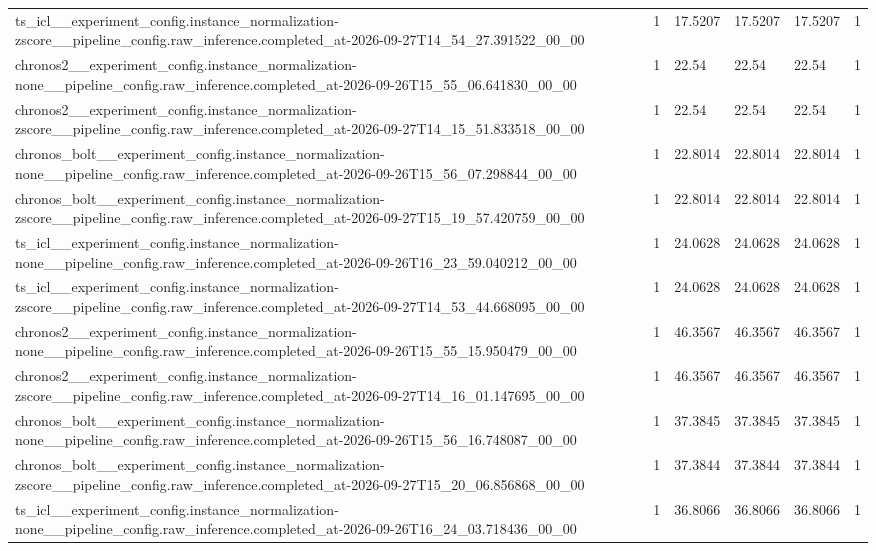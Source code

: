 \begin{tabular}{llllll}
ts\_icl\_\_experiment\_config.instance\_normalization-zscore\_\_pipeline\_config.raw\_inference.completed\_at-2026-09-27T14\_54\_27.391522\_00\_00 & 1 & 17.5207 & 17.5207 & 17.5207 & 1 \\
chronos2\_\_experiment\_config.instance\_normalization-none\_\_pipeline\_config.raw\_inference.completed\_at-2026-09-26T15\_55\_06.641830\_00\_00 & 1 & 22.54 & 22.54 & 22.54 & 1 \\
chronos2\_\_experiment\_config.instance\_normalization-zscore\_\_pipeline\_config.raw\_inference.completed\_at-2026-09-27T14\_15\_51.833518\_00\_00 & 1 & 22.54 & 22.54 & 22.54 & 1 \\
chronos\_bolt\_\_experiment\_config.instance\_normalization-none\_\_pipeline\_config.raw\_inference.completed\_at-2026-09-26T15\_56\_07.298844\_00\_00 & 1 & 22.8014 & 22.8014 & 22.8014 & 1 \\
chronos\_bolt\_\_experiment\_config.instance\_normalization-zscore\_\_pipeline\_config.raw\_inference.completed\_at-2026-09-27T15\_19\_57.420759\_00\_00 & 1 & 22.8014 & 22.8014 & 22.8014 & 1 \\
ts\_icl\_\_experiment\_config.instance\_normalization-none\_\_pipeline\_config.raw\_inference.completed\_at-2026-09-26T16\_23\_59.040212\_00\_00 & 1 & 24.0628 & 24.0628 & 24.0628 & 1 \\
ts\_icl\_\_experiment\_config.instance\_normalization-zscore\_\_pipeline\_config.raw\_inference.completed\_at-2026-09-27T14\_53\_44.668095\_00\_00 & 1 & 24.0628 & 24.0628 & 24.0628 & 1 \\
chronos2\_\_experiment\_config.instance\_normalization-none\_\_pipeline\_config.raw\_inference.completed\_at-2026-09-26T15\_55\_15.950479\_00\_00 & 1 & 46.3567 & 46.3567 & 46.3567 & 1 \\
chronos2\_\_experiment\_config.instance\_normalization-zscore\_\_pipeline\_config.raw\_inference.completed\_at-2026-09-27T14\_16\_01.147695\_00\_00 & 1 & 46.3567 & 46.3567 & 46.3567 & 1 \\
chronos\_bolt\_\_experiment\_config.instance\_normalization-none\_\_pipeline\_config.raw\_inference.completed\_at-2026-09-26T15\_56\_16.748087\_00\_00 & 1 & 37.3845 & 37.3845 & 37.3845 & 1 \\
chronos\_bolt\_\_experiment\_config.instance\_normalization-zscore\_\_pipeline\_config.raw\_inference.completed\_at-2026-09-27T15\_20\_06.856868\_00\_00 & 1 & 37.3844 & 37.3844 & 37.3844 & 1 \\
ts\_icl\_\_experiment\_config.instance\_normalization-none\_\_pipeline\_config.raw\_inference.completed\_at-2026-09-26T16\_24\_03.718436\_00\_00 & 1 & 36.8066 & 36.8066 & 36.8066 & 1 \\

\end{tabular}
